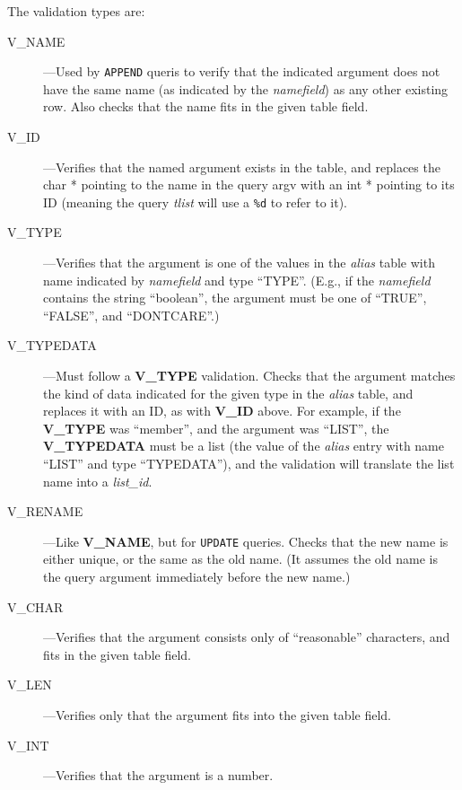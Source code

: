 The validation types are:

\begin{description}
\item[V\_NAME]---Used by {\tt APPEND} queris to verify that the
indicated argument does not have the same name (as indicated by the
{\it namefield\/}) as any other existing row. Also checks that the
name fits in the given table field.

\item[V\_ID]---Verifies that the named argument exists in the table,
and replaces the char * pointing to the name in the query argv with
an int * pointing to its ID (meaning the query {\it tlist\/} will use
a {\tt \%d} to refer to it).

\item[V\_TYPE]---Verifies that the argument is one of the values in the
{\it alias\/} table with name indicated by {\it namefield} and type
``TYPE''. (E.g., if the {\it namefield} contains the string
``boolean'', the argument must be one of ``TRUE'', ``FALSE'', and
``DONTCARE''.)

\item[V\_TYPEDATA]---Must follow a {\bf V\_TYPE} validation. Checks
that the argument matches the kind of data indicated for the given
type in the {\it alias\/} table, and replaces it with an ID, as with
{\bf V\_ID} above. For example, if the {\bf V\_TYPE} was ``member'',
and the argument was ``LIST'', the {\bf V\_TYPEDATA} must be a list
(the value of the {\it alias} entry with name ``LIST'' and type
``TYPEDATA''), and the validation will translate the list name into a
{\it list\_id}.

\item[V\_RENAME]---Like {\bf V\_NAME}, but for {\tt UPDATE} queries.
Checks that the new name is either unique, or the same as the old
name. (It assumes the old name is the query argument immediately
before the new name.)

\item[V\_CHAR]---Verifies that the argument consists only of
``reasonable'' characters, and fits in the given table field.

\item[V\_LEN]---Verifies only that the argument fits into the given
table field.

\item[V\_INT]---Verifies that the argument is a number.

\end{description}


